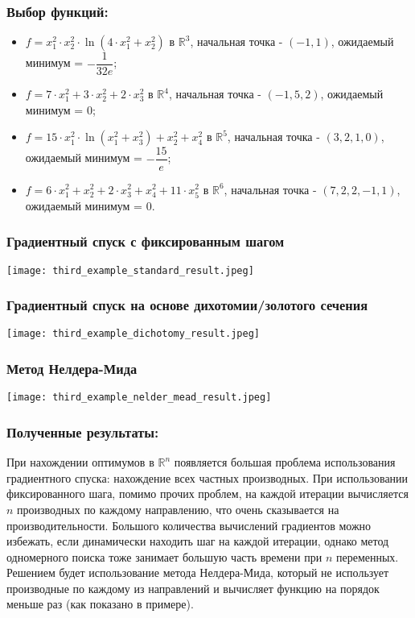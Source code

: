 \documentclass{article}
\begin{document}
\subsubsection*{Выбор функций:}
\begin{itemize}
    \item $f = x_1^2 \cdot x_2^2 \cdot \ln{(4 \cdot x_1^2 + x_2^2)}$ в $\mathbb{R}^3$, начальная точка - $(-1, 1)$, ожидаемый минимум = $-\dfrac{1}{32e}$;
    \item $f = 7 \cdot x_1^2 + 3 \cdot x_2^2 + 2 \cdot x_3^2$ в $\mathbb{R}^4$, начальная точка - $(-1, 5, 2)$, ожидаемый минимум = $0$;
    \item $f = 15 \cdot x_1^2 \cdot \ln{(x_1^2 + x_3^2)} + x_2^2 + x_4^2$ в $\mathbb{R}^5$, начальная точка - $(3, 2, 1, 0)$, ожидаемый минимум = $-\dfrac{15}{e}$;
    \item $f = 6 \cdot x_1^2 + x_2^2 + 2 \cdot x_3^2 + x_4^2 + 11 \cdot x_5^2$ в $\mathbb{R}^6$, начальная точка - $(7, 2, 2, -1, 1)$, ожидаемый минимум = $0$.
\end{itemize}
\subsubsection*{Градиентный спуск с фиксированным шагом}
\texttt{[image: third\_example\_standard\_result.jpeg]}
\subsubsection*{Градиентный спуск на основе дихотомии/золотого сечения}
\texttt{[image: third\_example\_dichotomy\_result.jpeg]}
\subsubsection*{Метод Нелдера-Мида}
\texttt{[image: third\_example\_nelder\_mead\_result.jpeg]}
\subsubsection*{Полученные результаты:}
При нахождении оптимумов в $\mathbb{R}^n$ появляется большая проблема использования градиентного спуска: нахождение всех частных производных. При использовании фиксированного шага, помимо прочих проблем, на каждой итерации вычисляется $n$ производных по каждому направлению, что очень сказывается на производительности. Большого количества вычислений градиентов можно избежать, если динамически находить шаг на каждой итерации, однако метод одномерного поиска тоже занимает большую часть времени при $n$ переменных. Решением будет использование метода Нелдера-Мида, который не использует производные по каждому из направлений и вычисляет функцию на порядок меньше раз (как показано в примере).
\end{document}
